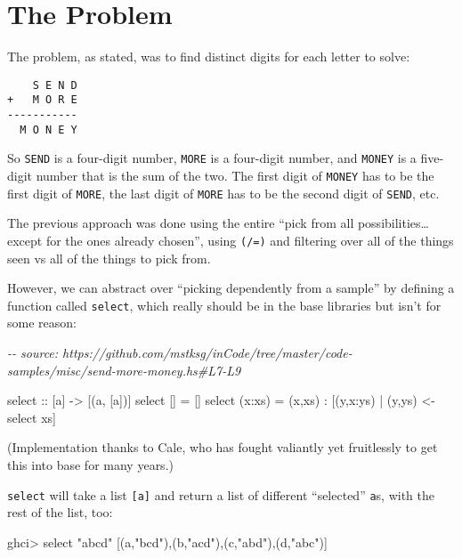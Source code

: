 \documentclass[]{article}
\newenvironment{Shaded}{}{}
\newcommand{\CharTok}[1]{\textcolor[rgb]{0.25,0.44,0.63}{#1}}
\newcommand{\CommentTok}[1]{\textcolor[rgb]{0.38,0.63,0.69}{\textit{#1}}}
\newcommand{\NormalTok}[1]{#1}
\newcommand{\OperatorTok}[1]{\textcolor[rgb]{0.40,0.40,0.40}{#1}}
\newcommand{\OtherTok}[1]{\textcolor[rgb]{0.00,0.44,0.13}{#1}}
\newcommand{\StringTok}[1]{\textcolor[rgb]{0.25,0.44,0.63}{#1}}
\begin{document}
\hypertarget{the-problem}{%
\section{The Problem}\label{the-problem}}

The problem, as stated, was to find distinct digits for each letter to solve:

\begin{verbatim}
    S E N D
+   M O R E
-----------
  M O N E Y
\end{verbatim}

So \texttt{SEND} is a four-digit number, \texttt{MORE} is a four-digit number,
and \texttt{MONEY} is a five-digit number that is the sum of the two. The first
digit of \texttt{MONEY} has to be the first digit of \texttt{MORE}, the last
digit of \texttt{MORE} has to be the second digit of \texttt{SEND}, etc.

The previous approach was done using the entire ``pick from all
possibilities\ldots except for the ones already chosen'', using \texttt{(/=)}
and filtering over all of the things seen vs all of the things to pick from.

However, we can abstract over ``picking dependently from a sample'' by defining
a function called \texttt{select}, which really should be in the base libraries
but isn't for some reason:

\begin{Shaded}
\begin{Highlighting}[]
\CommentTok{{-}{-} source: https://github.com/mstksg/inCode/tree/master/code{-}samples/misc/send{-}more{-}money.hs\#L7{-}L9}

\OtherTok{select ::}\NormalTok{ [a] }\OtherTok{{-}>}\NormalTok{ [(a, [a])]}
\NormalTok{select []     }\OtherTok{=}\NormalTok{ []}
\NormalTok{select (x}\OperatorTok{:}\NormalTok{xs) }\OtherTok{=}\NormalTok{ (x,xs) }\OperatorTok{:}\NormalTok{ [(y,x}\OperatorTok{:}\NormalTok{ys) }\OperatorTok{|}\NormalTok{ (y,ys) }\OtherTok{<{-}}\NormalTok{ select xs]}
\end{Highlighting}
\end{Shaded}

(Implementation thanks to Cale, who has fought valiantly yet fruitlessly to get
this into base for many years.)

\texttt{select} will take a list \texttt{{[}a{]}} and return a list of different
``selected'' \texttt{a}s, with the rest of the list, too:

\begin{Shaded}
\begin{Highlighting}[]
\NormalTok{ghci}\OperatorTok{>}\NormalTok{ select }\StringTok{"abcd"}
\NormalTok{[(}\CharTok{\textquotesingle{}a\textquotesingle{}}\NormalTok{,}\StringTok{"bcd"}\NormalTok{),(}\CharTok{\textquotesingle{}b\textquotesingle{}}\NormalTok{,}\StringTok{"acd"}\NormalTok{),(}\CharTok{\textquotesingle{}c\textquotesingle{}}\NormalTok{,}\StringTok{"abd"}\NormalTok{),(}\CharTok{\textquotesingle{}d\textquotesingle{}}\NormalTok{,}\StringTok{"abc"}\NormalTok{)]}
\end{Highlighting}
\end{Shaded}
\end{document}
